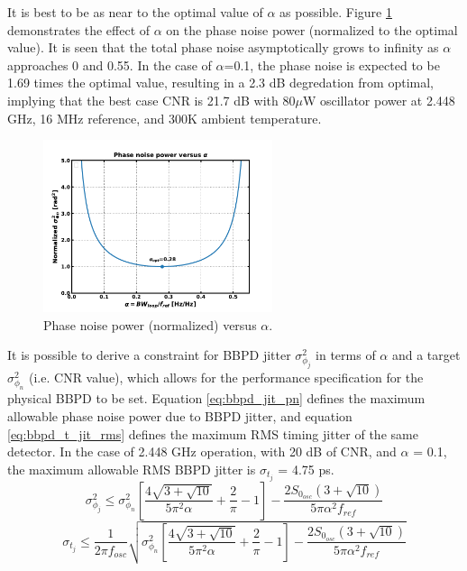 			It is best to be as near to the optimal value of $\alpha$ as possible. Figure \ref{fig:alpha_v_pn} demonstrates the effect of $\alpha$ on the phase noise power (normalized to the optimal value). It is seen that the total phase noise asymptotically grows to infinity as $\alpha$ approaches 0 and 0.55. In the case of $\alpha$=0.1, the phase noise is expected to be 1.69 times the optimal value, resulting in a 2.3 dB degredation from optimal, implying that the best case CNR is 21.7 dB with 80$\mu$W oscillator power at 2.448 GHz, 16 MHz reference, and 300K ambient temperature.

			\begin{figure}[htb!]
				\center\includegraphics[width=0.6\textwidth, angle=0]{./figs/design/alpha_v_pn}
				\caption{Phase noise power (normalized) versus $\alpha$.}
				\label{fig:alpha_v_pn}
			\end{figure}

			It is possible to derive a constraint for BBPD jitter $\sigma^2_{\phi_j}$ in terms of $\alpha$ and a target $\sigma^2_{\phi_n}$ (i.e. CNR value), which allows for the performance specification for the physical BBPD to be set. Equation \ref{eq:bbpd_jit_pn} defines the maximum allowable phase noise power due to BBPD jitter, and equation \ref{eq:bbpd_t_jit_rms} defines the maximum RMS timing jitter of the same detector. In the case of 2.448 GHz operation, with 20 dB of CNR, and $\alpha$ = 0.1, the maximum allowable RMS BBPD jitter is $\sigma_{t_j}$ = 4.75 ps.
			\begin{equation}\label{eq:bbpd_jit_pn}
				\sigma^2_{\phi_j} \leq \sigma^2_{\phi_n}\left[\frac{4\sqrt{3+\sqrt{10}}}{5\pi^2\alpha} +\frac{2}{\pi} - 1 \right] - \frac{2S_{0_{osc}}(3 + \sqrt{10})}{5\pi\alpha^2f_{ref}}
			\end{equation}
			\begin{equation}\label{eq:bbpd_t_jit_rms}
				\sigma_{t_j} \leq \frac{1}{2\pi f_{osc}}\sqrt{\sigma^2_{\phi_n}\left[\frac{4\sqrt{3+\sqrt{10}}}{5\pi^2\alpha} +\frac{2}{\pi} - 1 \right] - \frac{2S_{0_{osc}}(3 + \sqrt{10})}{5\pi\alpha^2f_{ref}}}
			\end{equation}

